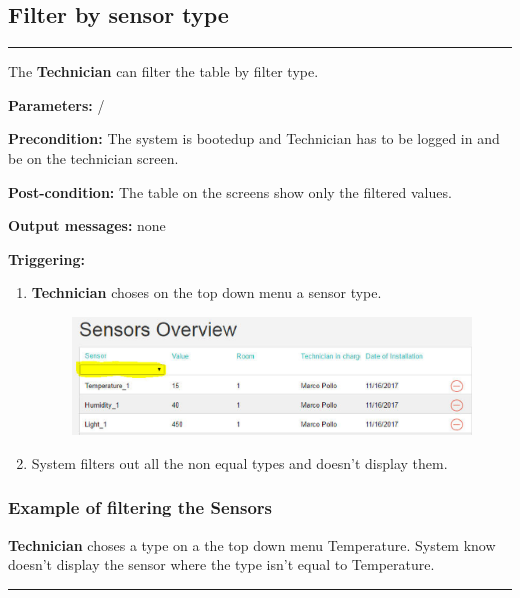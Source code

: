 \subsection{Filter by sensor type}

\hrule
\hfill
\vspace{0.5cm}

\label{operation:filterSensorTable}

The \textbf{Technician} can filter the table by filter type.
\begin{description}

\item \textbf{Parameters:} /
\item \textbf{Precondition:} The system is bootedup and Technician has to be
logged in and be on the technician screen.
\item \textbf{Post-condition:} The table on the screens show only the filtered
values.
\item \textbf{Output messages:} none
\item \textbf{Triggering:}
\begin{enumerate}
\item \textbf{Technician} choses on the top down menu a sensor type.
\begin{figure}[H]
\includegraphics[width=1\textwidth]{images/FilterSensorByTypeTechnician.eps}
\end{figure}
\item System filters out all the non equal types and doesn't display them.
\end{enumerate}
\end{description}

\subsubsection{Example of filtering the Sensors}
\textbf{Technician} choses a type on a the top down menu Temperature. System
know doesn't display the sensor where the type isn't equal to Temperature.
\hfill
\vspace{0.5cm}
\hrule

\break

